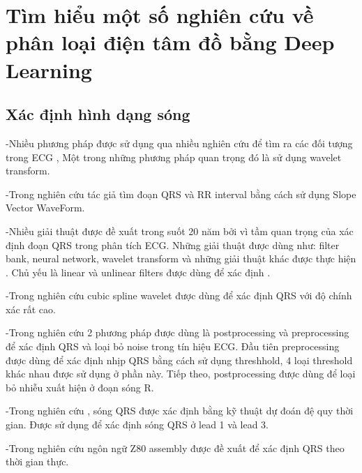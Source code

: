 \chapter{Tìm hiểu một số nghiên cứu về phân loại điện tâm đồ bằng Deep Learning}

\section{Xác định hình dạng sóng}
-Nhiều phương pháp được sử dụng qua nhiều nghiên cứu để tìm ra các đối tượng trong ECG \cite{realtimeQRS} \cite{concho}, Một trong những phương pháp quan trọng đó là sử dụng wavelet transform.\par
-Trong nghiên cứu \cite{4} tác giả tìm đoạn QRS và RR interval bằng cách sử dụng Slope Vector WaveForm.\par
-Nhiều giải thuật được đề xuất trong suốt 20 năm bởi vì tầm quan trọng của xác định đoạn QRS trong phân tích ECG. Những giải thuật được dùng như: filter bank, neural network, wavelet transform và những giải thuật khác được thực hiện \cite{5}. Chủ yếu là linear và unlinear filters được dùng để xác định \cite{6}.\par
-Trong nghiên cứu \cite{7} cubic spline wavelet được dùng để xác định QRS với độ chính xác rất cao.\par
-Trong nghiên cứu \cite{8} 2 phương pháp được dùng là postprocessing và preprocessing để xác định QRS và loại bỏ noise trong tín hiệu ECG. Đầu tiên preprocessing được dùng để xác định nhịp QRS bằng cách sử dụng threshhold, 4 loại threshold khác nhau được sử  dụng ở phần này. Tiếp theo, postprocessing được dùng để loại bỏ nhiễu xuất hiện ở đoạn sóng R.\par
-Trong nghiên cứu \cite{9}, sóng QRS được xác định bằng kỹ thuật dự đoán đệ quy thời gian. Được sử dụng để xác định sóng QRS ở lead 1 và lead 3.\par
-Trong nghiên cứu \cite{10} ngôn ngữ Z80 assembly được đề xuất để xác định QRS theo thời gian thực.
